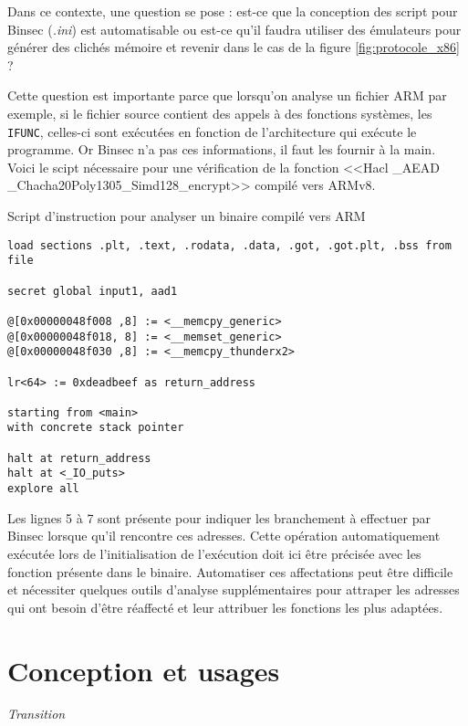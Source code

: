 Dans ce contexte, une question se pose : est-ce que la conception des script pour Binsec (\textit{.ini}) est automatisable ou est-ce qu'il faudra utiliser des émulateurs pour générer des clichés mémoire et revenir dans le cas de la figure \ref{fig:protocole_x86} ?\smallbreak

Cette question est importante parce que lorsqu'on analyse un fichier ARM par exemple, si le fichier source contient des appels à des fonctions systèmes, les \texttt{IFUNC}, celles-ci sont exécutées en fonction de l'architecture qui exécute le programme. Or Binsec n'a pas ces informations, il faut les fournir à la main. Voici le scipt nécessaire pour une vérification de la fonction <<Hacl \_AEAD \_Chacha20Poly1305\_Simd128\_encrypt>> compilé vers ARMv8.

\begin{listing}[!ht]
    \caption{Script d'instruction pour analyser un binaire compilé vers ARM}
    \label{lst:script_arm_exemple}
    \begin{verbatim}
load sections .plt, .text, .rodata, .data, .got, .got.plt, .bss from file

secret global input1, aad1

@[0x00000048f008 ,8] := <__memcpy_generic>
@[0x00000048f018, 8] := <__memset_generic>
@[0x00000048f030 ,8] := <__memcpy_thunderx2>

lr<64> := 0xdeadbeef as return_address

starting from <main>
with concrete stack pointer

halt at return_address
halt at <_IO_puts>
explore all 
    \end{verbatim}
\end{listing}

Les lignes 5 à 7 sont présente pour indiquer les branchement à effectuer par Binsec lorsque qu'il rencontre ces adresses. Cette opération automatiquement exécutée lors de l'initialisation de l'exécution doit ici être précisée avec les fonction présente dans le binaire. Automatiser ces affectations peut être difficile et nécessiter quelques outils d'analyse supplémentaires pour attraper les adresses qui ont besoin d'être réaffecté et leur attribuer les fonctions les plus adaptées.\medbraek

\section{Conception et usages}



\vfill
\textit{Transition}